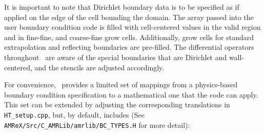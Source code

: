 It is important to note that Dirichlet boundary data is to be specified as 
if applied on the edge of the cell bounding the domain. The array passed into the 
user boundary condition code is filled with cell-centered values in the valid 
region and in fine-fine, and coarse-fine grow cells.  Additionally, grow cells 
for standard extrapolation and reflecting boundaries are pre-filled.  The 
differential operators throughout \pelelm\ are aware of the special boundaries
that are Dirichlet and wall-centered, and the stencils are adjusted accordingly.

For convenience, \pelelm\ provides a limited set of mappings from a physics-based boundary condition
specification to a mathematical one that the code can apply.  This set can be extended
by adjusting the corresponding translations in {\tt HT\_setup.cpp}, but, by default, includes 
(See {\tt AMReX/Src/C\_AMRLib/amrlib/BC\_TYPES.H} for more detail):
